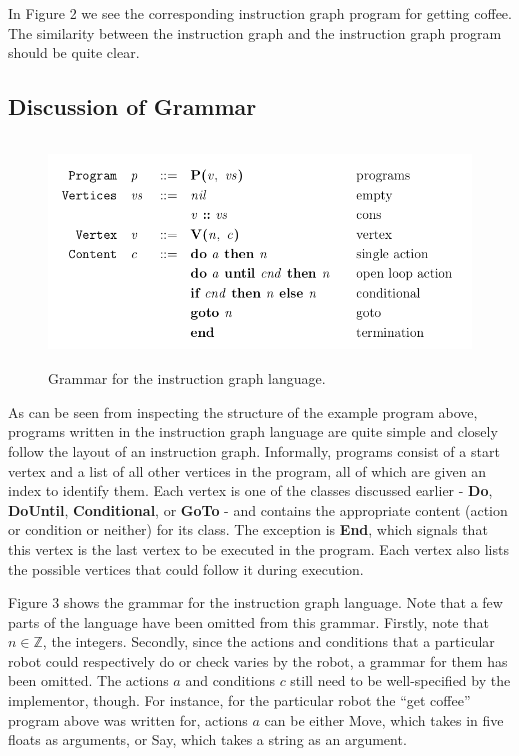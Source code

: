 \documentclass{sig-alternate-05-2015}
\begin{document}
In Figure 2 we see the corresponding instruction graph program for getting
coffee. The similarity between the instruction graph and the instruction graph
program should be quite clear.

\subsection{Discussion of Grammar}

\begin{figure}
\centering
\includegraphics[height=2.35in, width=5.1in]{images/grammar.png}
\caption{Grammar for the instruction graph language.}
\end{figure}

As can be seen from inspecting the structure of the example program above,
programs written in the instruction graph language are quite simple and closely
follow the layout of an instruction graph. Informally, programs consist of a
start vertex and a list of all other vertices in the program, all of which are
given an index to identify them. Each vertex is one of the classes discussed
earlier - \textbf{Do}, \textbf{DoUntil}, \textbf{Conditional}, or \textbf{GoTo}
- and contains the appropriate content (action or condition or neither) for its
class. The exception is \textbf{End}, which signals that this vertex is the last
vertex to be executed in the program. Each vertex also lists the possible
vertices that could follow it during execution.

Figure 3 shows the grammar for the instruction graph language. Note that a few
parts of the language have been omitted from this grammar. Firstly, note that
$n \in \mathbb{Z}$, the integers. Secondly, since the actions and conditions
that a particular robot could respectively do or check varies by the robot, a
grammar for them has been omitted. The actions $a$ and conditions $c$ still
need to be well-specified by the implementor, though. For instance, for the
particular robot the ``get coffee'' program above was written for, actions $a$
can be either Move, which takes in five floats as arguments, or Say, which takes
a string as an argument.
\end{document}
